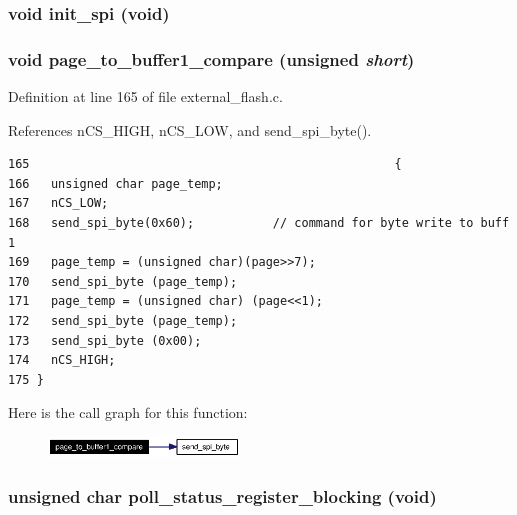 \subsubsection{\setlength{\rightskip}{0pt plus 5cm}void init\_\-spi (void)}\label{external__flash_8h_a6}


\subsubsection{\setlength{\rightskip}{0pt plus 5cm}void page\_\-to\_\-buffer1\_\-compare (unsigned {\em short})}\label{external__flash_8h_a9}




Definition at line 165 of file external\_\-flash.c.

References n\-CS\_\-HIGH, n\-CS\_\-LOW, and send\_\-spi\_\-byte().

\footnotesize\begin{verbatim}165                                                   {
166   unsigned char page_temp;
167   nCS_LOW;
168   send_spi_byte(0x60);           // command for byte write to buff 1
169   page_temp = (unsigned char)(page>>7);
170   send_spi_byte (page_temp);
171   page_temp = (unsigned char) (page<<1);
172   send_spi_byte (page_temp);
173   send_spi_byte (0x00);
174   nCS_HIGH;
175 }
\end{verbatim}\normalsize 




Here is the call graph for this function:\begin{figure}[H]
\begin{center}
\leavevmode
\includegraphics[width=144pt]{external__flash_8h_a9_cgraph}
\end{center}
\end{figure}
\subsubsection{\setlength{\rightskip}{0pt plus 5cm}unsigned char poll\_\-status\_\-register\_\-blocking (void)}\label{external__flash_8h_a12}




